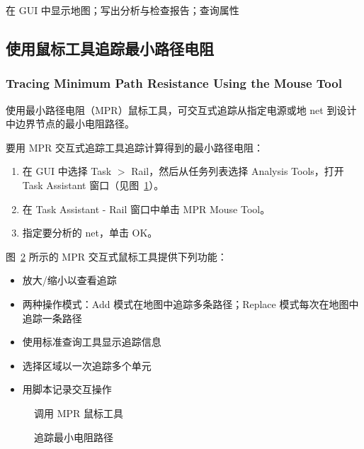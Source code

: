 \begin{seeAlsoBox}
在 GUI 中显示地图；写出分析与检查报告；查询属性
\end{seeAlsoBox}

\subsection{使用鼠标工具追踪最小路径电阻}
\subsubsection*{Tracing Minimum Path Resistance Using the Mouse Tool}

使用最小路径电阻（MPR）鼠标工具，可交互式追踪从指定电源或地 net 到设计中边界节点的最小电阻路径。

要用 MPR 交互式追踪工具追踪计算得到的最小路径电阻：
\begin{enumerate}
  \item 在 GUI 中选择 Task $>$ Rail，然后从任务列表选择 Analysis Tools，打开 Task Assistant 窗口（见图~\ref{fig:mpr-tool}）。
  \item 在 Task Assistant - Rail 窗口中单击 MPR Mouse Tool。
  \item 指定要分析的 net，单击 OK。
\end{enumerate}

图~\ref{fig:mpr-trace-map} 所示的 MPR 交互式鼠标工具提供下列功能：
\begin{itemize}
  \item 放大/缩小以查看追踪
  \item 两种操作模式：Add 模式在地图中追踪多条路径；Replace 模式每次在地图中追踪一条路径
  \item 使用标准查询工具显示追踪信息
  \item 选择区域以一次追踪多个单元
  \item 用脚本记录交互操作
\end{itemize}

\begin{figure}[htbp]
\centering
{}
\caption{调用 MPR 鼠标工具}
\label{fig:mpr-tool}
\end{figure}

\begin{figure}[htbp]
\centering
{}
\caption{追踪最小电阻路径}
\label{fig:mpr-trace-map}
\end{figure}

